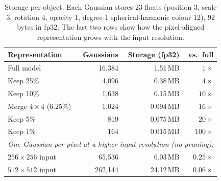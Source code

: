 \begin{table}[t]
\centering
\small
\begin{tabular}{lrrr}
\toprule
Representation & Gaussians & Storage (fp32) & vs.\ full \\
\midrule
Full model & 16{,}384 & 1.51\,MB & $1\times$ \\
Keep 25\% & 4{,}096 & 0.38\,MB & $4\times$ \\
Keep 10\% & 1{,}638 & 0.15\,MB & $10\times$ \\
Merge $4{\times}4$ (6.25\%) & 1{,}024 & 0.094\,MB & $16\times$ \\
Keep 5\% & 819 & 0.075\,MB & $20\times$ \\
Keep 1\% & 164 & 0.015\,MB & $100\times$ \\
\midrule
\multicolumn{4}{l}{\emph{One Gaussian per pixel at a higher input resolution (no pruning):}} \\
$256 \times 256$ input & 65{,}536 & 6.03\,MB & $0.25\times$ \\
$512 \times 512$ input & 262{,}144 & 24.12\,MB & $0.06\times$ \\
\bottomrule
\end{tabular}
\caption{Storage per object. Each Gaussian stores $23$ floats (position 3, scale 3, rotation 4, opacity 1, degree-1 spherical-harmonic colour 12), \ie $92$ bytes in fp32. The last two rows show how the pixel-aligned representation grows with the input resolution.}
\label{tab:storage}
\end{table}
